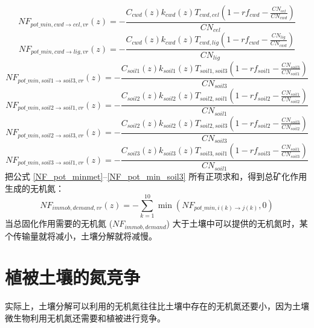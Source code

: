 \begin{equation}
    NF_{pot\_{min,cwd \rightarrow {cel,vr}}}(z)=-\frac{C_{cwd}\left(z\right)k_{cwd}\left(z\right)T_{cwd,cel}\left(1-rf_{cwd}-\frac{CN_{cel}}{CN_{cwd}}\right)}{CN_{cel}}
\end{equation}
\begin{equation}
    NF_{pot\_{min,cwd \rightarrow {lig,vr}}}(z)=-\frac{C_{cwd}\left(z\right)k_{cwd}\left(z\right)T_{cwd,lig}\left(1-rf_{cwd}-\frac{CN_{lig}}{CN_{cwd}}\right)}{CN_{lig}}
\end{equation}
\begin{equation}
    NF_{pot\_{min,soil1\rightarrow {soil3,vr}}}(z)=-\frac{C_{soil1}\left(z\right)k_{soil1}\left(z\right)T_{soil1,soil3}\left(1-rf_{soil1}-\frac{CN_{soil3}}{CN_{soil1}}\right)}{CN_{soil3}}
\end{equation}
\begin{equation}
    NF_{pot\_{min,soil2 \rightarrow {soil1,vr}}}(z)=-\frac{C_{soil2}\left(z\right)k_{soil2}\left(z\right)T_{soil2,soil1}\left(1-rf_{soil2}-\frac{CN_{soil1}}{CN_{soil2}}\right)}{CN_{soil1}}
\end{equation}
\begin{equation}
    NF_{pot\_{min,soil2 \rightarrow {soil3,vr}}}(z)=-\frac{C_{soil2}\left(z\right)k_{soil2}\left(z\right)T_{soil2,soil3}\left(1-rf_{soil2}-\frac{CN_{soil3}}{CN_{soil2}}\right)}{CN_{soil3}}
\end{equation}
\begin{equation}\label{NF_pot_min_soil3}
    NF_{pot\_{min,soil3 \rightarrow {soil1,vr}}}(z)=-\frac{C_{soil3}\left(z\right)k_{soil3}\left(z\right)T_{soil3,soil1}\left(1-rf_{soil3}-\frac{CN_{soil1}}{CN_{soil3}}\right)}{CN_{soil1}}
\end{equation}
把公式 \eqref{NF_pot_minmet}--\eqref{NF_pot_min_soil3} 所有正项求和，得到总矿化作用生成的无机氮：
\begin{equation}\label{NF_immob_demand_vr}
    NF_{immob,demand,vr}(z)=-\sum_{k=1}^{10}\min{\left(NF_{pot\_min,i(k)\rightarrow j (k)}, 0\right)}
\end{equation}
当总固化作用需要的无机氮 ($NF_{immob,demand}$) 大于土壤中可以提供的无机氮时，某个传输量就将减小，土壤分解就将减慢。


\section{植被土壤的氮竞争}\label{植被土壤的氮竞争}
实际上，土壤分解可以利用的无机氮往往比土壤中存在的无机氮还要小，因为土壤微生物利用无机氮还需要和植被进行竞争。

